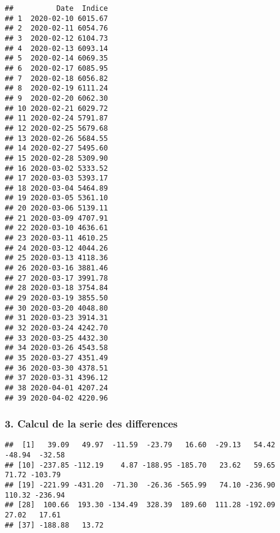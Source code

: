 \documentclass[
]{article}
\newenvironment{Shaded}{\begin{snugshade}}{\end{snugshade}}
\newcommand{\AttributeTok}[1]{\textcolor[rgb]{0.13,0.29,0.53}{#1}}
\newcommand{\DecValTok}[1]{\textcolor[rgb]{0.00,0.00,0.81}{#1}}
\newcommand{\FunctionTok}[1]{\textcolor[rgb]{0.13,0.29,0.53}{\textbf{#1}}}
\newcommand{\NormalTok}[1]{#1}
\newcommand{\OtherTok}[1]{\textcolor[rgb]{0.56,0.35,0.01}{#1}}
\newcommand{\SpecialCharTok}[1]{\textcolor[rgb]{0.81,0.36,0.00}{\textbf{#1}}}
\begin{document}
\begin{verbatim}
##          Date  Indice
## 1  2020-02-10 6015.67
## 2  2020-02-11 6054.76
## 3  2020-02-12 6104.73
## 4  2020-02-13 6093.14
## 5  2020-02-14 6069.35
## 6  2020-02-17 6085.95
## 7  2020-02-18 6056.82
## 8  2020-02-19 6111.24
## 9  2020-02-20 6062.30
## 10 2020-02-21 6029.72
## 11 2020-02-24 5791.87
## 12 2020-02-25 5679.68
## 13 2020-02-26 5684.55
## 14 2020-02-27 5495.60
## 15 2020-02-28 5309.90
## 16 2020-03-02 5333.52
## 17 2020-03-03 5393.17
## 18 2020-03-04 5464.89
## 19 2020-03-05 5361.10
## 20 2020-03-06 5139.11
## 21 2020-03-09 4707.91
## 22 2020-03-10 4636.61
## 23 2020-03-11 4610.25
## 24 2020-03-12 4044.26
## 25 2020-03-13 4118.36
## 26 2020-03-16 3881.46
## 27 2020-03-17 3991.78
## 28 2020-03-18 3754.84
## 29 2020-03-19 3855.50
## 30 2020-03-20 4048.80
## 31 2020-03-23 3914.31
## 32 2020-03-24 4242.70
## 33 2020-03-25 4432.30
## 34 2020-03-26 4543.58
## 35 2020-03-27 4351.49
## 36 2020-03-30 4378.51
## 37 2020-03-31 4396.12
## 38 2020-04-01 4207.24
## 39 2020-04-02 4220.96
\end{verbatim}

\subsubsection{3. Calcul de la serie des
differences}\label{calcul-de-la-serie-des-differences}

\begin{Shaded}
\end{Shaded}

\begin{verbatim}
##  [1]   39.09   49.97  -11.59  -23.79   16.60  -29.13   54.42  -48.94  -32.58
## [10] -237.85 -112.19    4.87 -188.95 -185.70   23.62   59.65   71.72 -103.79
## [19] -221.99 -431.20  -71.30  -26.36 -565.99   74.10 -236.90  110.32 -236.94
## [28]  100.66  193.30 -134.49  328.39  189.60  111.28 -192.09   27.02   17.61
## [37] -188.88   13.72
\end{verbatim}

\begin{Shaded}
\end{Shaded}
\end{document}
